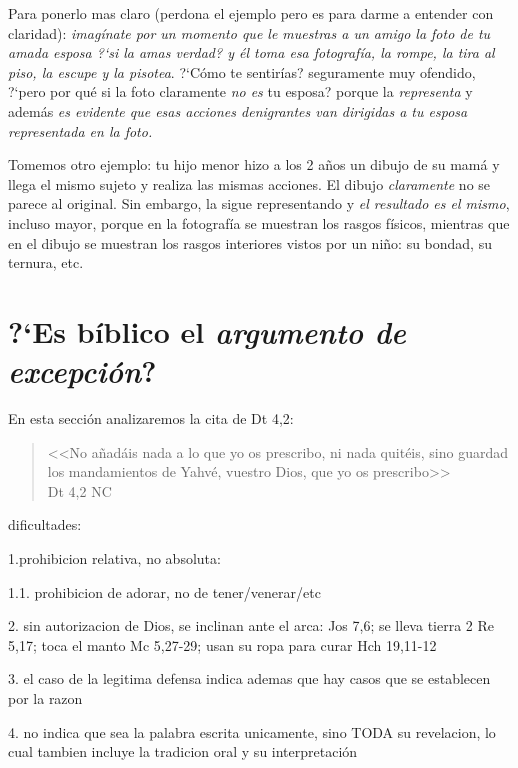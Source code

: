 \documentclass{article}
\begin{document}
Para ponerlo mas claro (perdona el ejemplo pero es para darme a entender con claridad): \emph{imag\'{i}nate por un momento que le muestras a un amigo la foto de tu amada esposa ?`si la amas verdad? y \'el toma esa fotograf\'{i}a, la rompe, la tira al piso, la escupe y la pisotea}. ?`C\'omo te sentir\'{i}as? seguramente muy ofendido, ?`pero por qu\'e si la foto claramente \emph{no es} tu esposa? porque la \emph{representa} y adem\'as \emph{es evidente que esas acciones denigrantes van dirigidas a tu esposa representada en la foto.}

Tomemos otro ejemplo: tu hijo menor hizo a los 2 a\~nos un dibujo de su mam\'a y llega el mismo sujeto y realiza las mismas acciones. El dibujo \emph{claramente} no se parece al original. Sin embargo, la sigue representando y \emph{el resultado es el mismo}, incluso mayor, porque en la fotograf\'{i}a se muestran los rasgos f\'{i}sicos, mientras que en el dibujo se muestran los rasgos interiores vistos por un ni\~no: su bondad, su ternura, etc.


\section{?`Es b\'{i}blico el \emph{argumento de excepci\'on}?}

En esta secci\'on analizaremos la cita de Dt 4,2:

\begin{quote}
<<No a\~nad\'ais nada a lo que yo os prescribo, ni nada quit\'eis, sino guardad los mandamientos de Yahv\'e, vuestro Dios, que yo os prescribo>>\\
Dt 4,2 NC
\end{quote}

dificultades:

1.prohibicion relativa, no absoluta:

1.1. prohibicion de adorar, no de tener/venerar/etc

2. sin autorizacion de Dios, se inclinan ante el arca: Jos 7,6; se lleva tierra 2 Re 5,17; toca el manto Mc 5,27-29; usan su ropa para curar Hch 19,11-12

3. el caso de la legitima defensa indica ademas que hay casos que se establecen por la razon

4. no indica que sea la palabra escrita unicamente, sino TODA su revelacion, lo cual tambien incluye la tradicion oral y su interpretaci\'on
\end{document}
